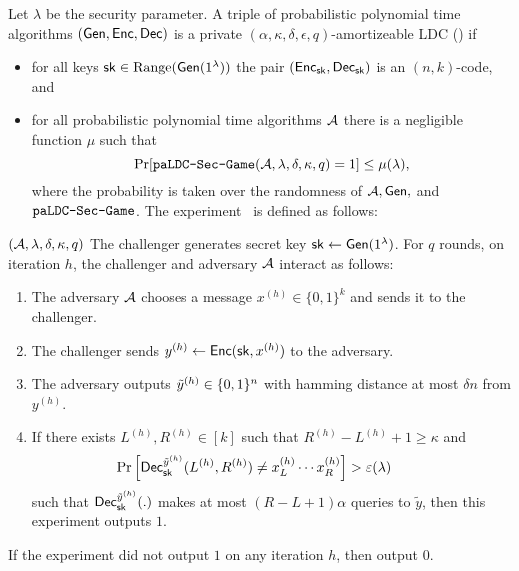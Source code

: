 \begin{definition}\label{def:paLDC}
    Let $\lambda$ be the security parameter. A triple of probabilistic polynomial time algorithms $(\mathsf{Gen},\mathsf{Enc},\mathsf{Dec})$ is a private $(\alpha, \kappa, \delta, \epsilon,q)$-amortizeable LDC (\paldc) if 
    \begin{itemize}
        \item for all keys $\mathsf{sk} \in \text{Range}(\mathsf{Gen}(1^\lambda))$ the pair $(\mathsf{Enc}_{\mathsf{sk}},\mathsf{Dec}_{\mathsf{sk}})$ is an $(n,k)$-code, and
        \item for all probabilistic polynomial time algorithms $\mathcal{A}$ there is a negligible function $\mu$ such that
        \[\Pr[\texttt{paLDC-Sec-Game}(\mathcal{A},\lambda,\delta,\kappa,q) = 1] \leq \mu(\lambda),\]
        where the probability is taken over the randomness of $\mathcal{A}, \mathsf{Gen},$ and $\texttt{paLDC-Sec-Game}$. 
        The experiment \paldcgame\ is defined as follows:
    \end{itemize}
     \begin{weirdFrame}%
        {\paldcgame$(\mathcal{A},\lambda,\delta,\kappa,q)$}
        The challenger generates secret key $\mathsf{sk} \leftarrow \mathsf{Gen}(1^\lambda)$. 
        For $q$ rounds, on iteration $h$, the challenger and adversary $\mathcal{A}$ interact as follows:
        \begin{enumerate}
            \item The adversary $\mathcal{A}$ chooses a message $x^{(h)} \in \{0,1\}^k$ and sends it to the challenger.
            \item The challenger sends $y^{(h)} \leftarrow \mathsf{Enc}(\mathsf{sk},x^{(h)})$ to the adversary.
            \item The adversary outputs $\Tilde{y}^{(h)} \in \{0,1\}^n$ with hamming distance at most $\delta n$ from $y^{(h)}$.
            \item If there exists $L^{(h)}, R^{(h)} \in [k]$ such that $R^{(h)} - L^{(h)} + 1 \geq \kappa$ and
            \[\hspace{-\leftmargin}\Pr\left[\Dec^{\Tilde{y}^{(h)}}_\sk(L^{(h)},R^{(h)}) \neq x^{(h)}_L\cdots x^{(h)}_R\right] > \eps(\lambda)\] such that $\mathsf{Dec}^{\Tilde{y}^{(h)}}_{\mathsf{sk}}(.)$ makes at most $(R - L + 1) \alpha$ queries to $\tilde y$, then this experiment outputs $1$.
        \end{enumerate}
        If the experiment did not output $1$ on any iteration $h$, then output $0.$
        \end{weirdFrame}
        \end{definition}